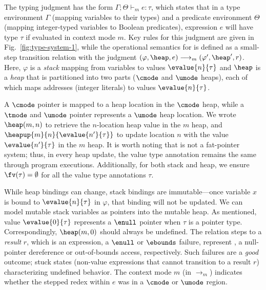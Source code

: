The typing judgment has the form $\Gamma;\Theta\vdash_m e : \tau$,
which states that in a type environment $\Gamma$ (mapping variables to
their types) and a predicate environment $\Theta$ (mapping integer-typed
variables to Boolean predicates), expression $e$ will have type $\tau$ if evaluated
in context mode $m$. Key rules for this judgment are given in
Fig.~\ref{fig:type-system-1},
while the operational semantics for \lang is defined as a small-step
transition relation with the judgment $ (\varphi,\heap,e)
\longrightarrow_m (\varphi',\heap',r)$.
 Here, $\varphi$ is a
\emph{stack} mapping from variables to values $\evalue{n}{\tau}$ and
$\heap$ is a \emph{heap} that is partitioned into two parts ($\cmode$ and $\umode$ heaps), each of which
maps addresses (integer literals) to values $\evalue{n}{\tau}$.

A $\cmode$ pointer is mapped to a heap location in the $\cmode$ heap, 
while a $\tmode$ and $\umode$ pointer represents a $\umode$ heap location.
We wrote $\heap(m,n)$ to retrieve the $n$-location heap value in the $m$ heap,
and $\heapup{m}{n}{\evalue{n'}{\tau}}$ 
to update location $n$ with the value $\evalue{n'}{\tau}$ in the $m$ heap.
It is worth noting that \systemname is not a fat-pointer system;
thus, in every heap update, the value type annotation remains the same through program executions.
% 
% 
Additionally, for both stack and heap, 
we ensure $\fv(\tau)=\emptyset$ for all the value type annotations $\tau$.

While heap bindings can change, stack bindings are immutable---once
variable $x$ is bound to $\evalue{n}{\tau}$ in $\varphi$, that binding will not
be updated. 
We can model mutable stack variables as pointers into the
mutable heap.
As mentioned, value $\evalue{0}{\tau}$
represents a $\enull$ pointer when $\tau$ is a pointer type.
Correspondingly, $\heap(m,0)$ should always be undefined.
% 
The relation steps to a \emph{result} $r$, which is   an
expression, a $\enull$ or $\ebounds$ failure, represent , a null-pointer dereference or out-of-bounds access,
respectively.
% 
Such failures are a \emph{good} outcome; stuck states
(non-value expressions that cannot transition to a result $r$)
characterizing undefined behavior.
%
% 
The context mode $m$ (in $\longrightarrow_{m}$) indicates whether the
stepped redex within $e$ was in a $\cmode$ or $\umode$ region.

